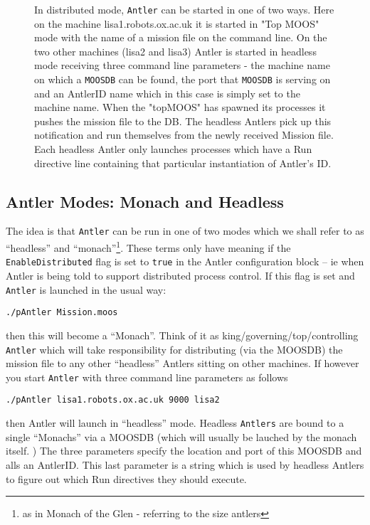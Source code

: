 \documentclass[a4paper,10pt]{article}
\newcommand{\Code}[1]{\texttt{#1} }
\newcommand{\code}[1]{\Code{#1} }
\begin{document}
\begin{figure}\label{Fig:Distributed}
\centering
{}
\caption{In distributed mode, \code{Antler} can be started in one of two ways. Here on the machine lisa1.robots.ox.ac.uk it is started  in "Top MOOS" mode with the name of a mission file on the command line. On the two other machines (lisa2 and lisa3) Antler is started in headless mode receiving three command line parameters - the machine name on which a \code{MOOSDB} can be found, the port that \code{MOOSDB} is serving on and an AntlerID name which in this case is simply set to the machine name. When the "topMOOS" has spawned its processes it pushes the mission file to the DB. The headless Antlers pick up this notification and run themselves from the newly received Mission file. Each headless Antler  only launches processes which have a Run directive line containing that particular instantiation of Antler's ID.} 
\end{figure}

\subsection{Antler Modes: Monach and Headless}

The idea is that \code{Antler} can be run in one of two modes which we shall refer to as ``headless'' and ``monach''\footnote{as in Monach of the Glen - referring to the size antlers}. These terms only have meaning if the \code{EnableDistributed} flag is set to \code{true} in the Antler configuration block -- ie when Antler is being told to support distributed process control. If this flag is set and \code{Antler} is launched in the usual way:

\begin{lstlisting}
./pAntler Mission.moos
\end{lstlisting}

then this will become a ``Monach''. Think of it as king/governing/top/controlling \code{Antler} which will take responsibility for distributing (via the MOOSDB) the mission file to any other ``headless'' Antlers sitting on other machines.  If however you start \code{Antler} with three command line parameters as follows

\begin{lstlisting}
./pAntler lisa1.robots.ox.ac.uk 9000 lisa2
\end{lstlisting}

then Antler will launch in ``headless'' mode. Headless \code{Antlers} are bound to a single ``Monachs'' via a MOOSDB (which will usually be lauched by the monach itself. ) The three parameters specify the location and port of this MOOSDB and alls an AntlerID. This last parameter is a string which is used by headless Antlers to figure out which Run directives they should execute.
\end{document}

